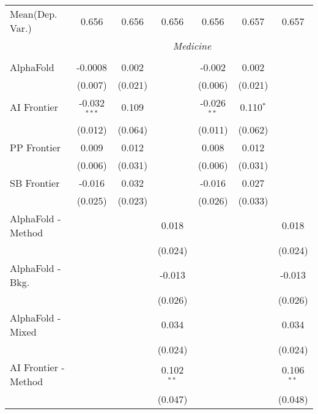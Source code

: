 \begin{tabular}{lcccccc}
Mean(Dep. Var.) & 0.656 & 0.656 & 0.656 & 0.656 & 0.657 & 0.657 \\
 & \multicolumn{6}{c}{\textit{Medicine}} \\ \\
   AlphaFold            & -0.0008        & 0.002   &              & -0.002        & 0.002       &   \\   
                        & (0.007)        & (0.021) &              & (0.006)       & (0.021)     &   \\   
   AI Frontier          & -0.032$^{***}$ & 0.109   &              & -0.026$^{**}$ & 0.110$^{*}$ &   \\   
                        & (0.012)        & (0.064) &              & (0.011)       & (0.062)     &   \\   
   PP Frontier          & 0.009          & 0.012   &              & 0.008         & 0.012       &   \\   
                        & (0.006)        & (0.031) &              & (0.006)       & (0.031)     &   \\   
   SB Frontier          & -0.016         & 0.032   &              & -0.016        & 0.027       &   \\   
                        & (0.025)        & (0.023) &              & (0.026)       & (0.033)     &   \\   
   AlphaFold - Method   &                &         & 0.018        &               &             & 0.018\\   
                        &                &         & (0.024)      &               &             & (0.024)\\   
   AlphaFold - Bkg.     &                &         & -0.013       &               &             & -0.013\\   
                        &                &         & (0.026)      &               &             & (0.026)\\   
   AlphaFold - Mixed    &                &         & 0.034        &               &             & 0.034\\   
                        &                &         & (0.024)      &               &             & (0.024)\\   
   AI Frontier - Method &                &         & 0.102$^{**}$ &               &             & 0.106$^{**}$\\   
                        &                &         & (0.047)      &               &             & (0.048)\\   

\end{tabular}
